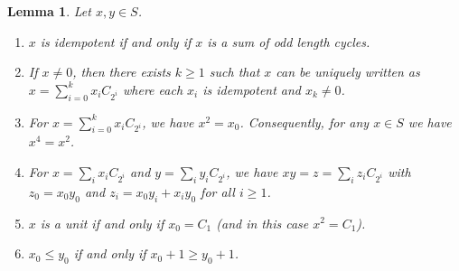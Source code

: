 \documentclass[a4paper, 11pt]{article}
\theoremstyle{plain}
\newtheorem{lemma}      [theorem]{Lemma}
\theoremstyle{definition}
\begin{document}
\begin{lemma}
\label{lem:basis}
Let $x,y \in S$.
\begin{enumerate}
\item \label{item:idempotent} $x$ is idempotent if and only if $x$ is a sum of odd length cycles.
\item \label{item:decomposition} If $x \neq 0$, then there exists $k \geq 1$ such that $x$ can be uniquely written as $x=\sum_{i=0}^k x_i C_{2^i}$ where each $x_i$ is idempotent and $x_k \neq 0$.
\item \label{item:x4=x2} For $x=\sum_{i=0}^k x_i C_{2^i}$, we have $x^2 = x_0$. Consequently, for any $x \in S$ we have $x^4 = x^2$.

\item \label{item:xy} For $x=\sum_i x_i C_{2^i}$ and $y = \sum_i y_i C_{2^i}$, we have $xy = z = \sum_i z_i C_{2^i}$ with $z_0 = x_0  y_0$ and $z_i = x_0 y_i + x_i y_0$ for all $i \ge 1$.

\item \label{item:unit} $x$ is a unit if and only if $x_0 = C_1$ (and in this case $x^2=C_1$).

\item \label{item:complement} $x_0 \leq y_0$ if and only if $x_0 + 1 \geq y_0 + 1$.
\end{enumerate}
\end{lemma}
\end{document}
